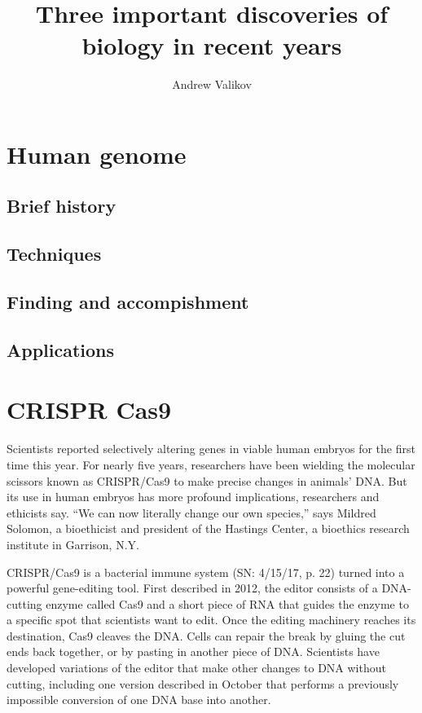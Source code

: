 \documentclass[12pt]{article}
\begin{document}
\title{Three important discoveries of biology in recent years}
\author{Andrew Valikov}
\date{}
\maketitle

\section{Human genome}

\subsection{Brief history}

\subsection{Techniques}

\subsection{Finding and accompishment}

\subsection{Applications}

\section{CRISPR Cas9}
Scientists reported selectively altering genes in viable human embryos for the first time this year. For nearly five years, researchers have been wielding the molecular scissors known as CRISPR/Cas9 to make precise changes in animals’ DNA. But its use in human embryos has more profound implications, researchers and ethicists say.
“We can now literally change our own species,” says Mildred Solomon, a bioethicist and president of the Hastings Center, a bioethics research institute in Garrison, N.Y.

CRISPR/Cas9 is a bacterial immune system (SN: 4/15/17, p. 22) turned into a powerful gene-editing tool. First described in 2012, the editor consists of a DNA-cutting enzyme called Cas9 and a short piece of RNA that guides the enzyme to a specific spot that scientists want to edit. Once the editing machinery reaches its destination, Cas9 cleaves the DNA. Cells can repair the break by gluing the cut ends back together, or by pasting in another piece of DNA. Scientists have developed variations of the editor that make other changes to DNA without cutting, including one version described in October that performs a previously impossible conversion of one DNA base into another.
\end{document}

